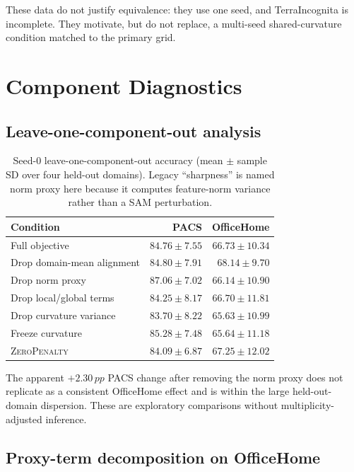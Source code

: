 \documentclass[10pt]{article}
\newcommand{\control}{\textsc{ZeroPenalty}}
\newcommand{\pp}{\,pp}
\begin{document}
These data do not justify equivalence: they use one seed, and TerraIncognita is
incomplete. They motivate, but do not replace, a multi-seed shared-curvature
condition matched to the primary grid.

\section{Component Diagnostics}
\label{sec:components}

\subsection{Leave-one-component-out analysis}

\begin{table}[H]
\centering
\caption{Seed-0 leave-one-component-out accuracy (mean $\pm$ sample SD over
four held-out domains). Legacy ``sharpness'' is named norm proxy here because it
computes feature-norm variance rather than a SAM perturbation.}
\label{tab:loo}
\begin{tabular}{lrr}
\toprule
Condition & PACS & OfficeHome \\
\midrule
Full objective             & $84.76\pm7.55$ & $66.73\pm10.34$ \\
Drop domain-mean alignment & $84.80\pm7.91$ & $68.14\pm9.70$ \\
Drop norm proxy            & $87.06\pm7.02$ & $66.14\pm10.90$ \\
Drop local/global terms    & $84.25\pm8.17$ & $66.70\pm11.81$ \\
Drop curvature variance    & $83.70\pm8.22$ & $65.63\pm10.99$ \\
Freeze curvature           & $85.28\pm7.48$ & $65.64\pm11.18$ \\
\control{}                   & $84.09\pm6.87$ & $67.25\pm12.02$ \\
\bottomrule
\end{tabular}
\end{table}

The apparent $+2.30\pp$ PACS change after removing the norm proxy does not
replicate as a consistent OfficeHome effect and is within the large
held-out-domain dispersion. These are exploratory comparisons without
multiplicity-adjusted inference.

\subsection{Proxy-term decomposition on OfficeHome}
\end{document}
